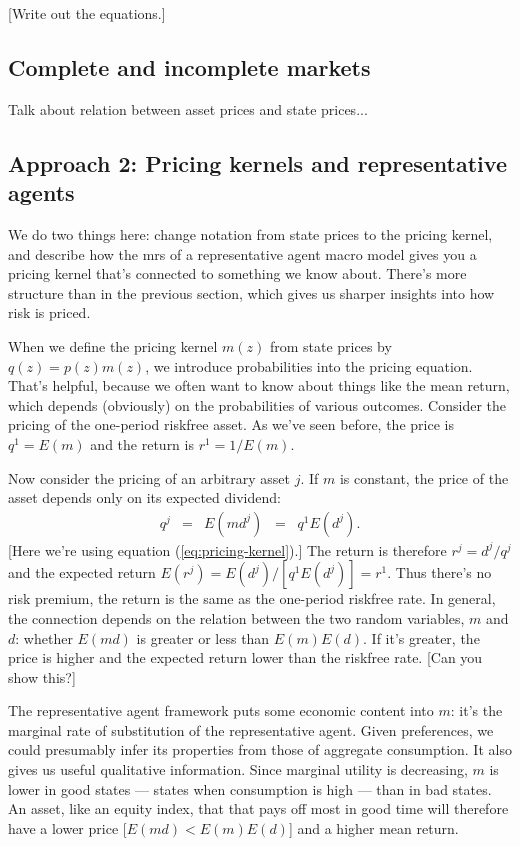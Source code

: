 \documentclass[11pt]{article}
\begin{document}
[Write out the equations.]


\subsection*{Complete and incomplete markets}

Talk about relation between asset prices and state prices...  



\subsection*{Approach 2:  Pricing kernels and representative agents}

We do two things here:  change notation from state prices to the pricing kernel,
and describe how the mrs of a representative agent macro model gives you a
pricing kernel that's connected to something we know about.
There's more structure than in the previous section,
which gives us sharper insights into how risk is priced.

When we define the pricing kernel $m(z)$ from state prices by $q(z) = p(z) m(z)$,
we introduce probabilities into the pricing equation.
That's helpful, because we often want to know about things like the mean
return, which depends (obviously) on the probabilities of various outcomes.
Consider the pricing of the one-period riskfree asset.
As we've seen before, the price is $q^1 = E(m)$ and the return is $r^1 = 1/E(m)$.

Now consider the pricing of an arbitrary asset $j$.
If $m$ is constant, the price of the asset depends only on its expected dividend:
\begin{eqnarray*}
    q^j &=& E (m d^j) \;\;=\;\; q^1 E(d^j) .
\end{eqnarray*}
[Here we're using equation (\ref{eq:pricing-kernel}).]
The return is therefore
$r^j = d^j/q^j$ and the expected return $E(r^j) = E(d^j)/[q^1 E(d^j)] = r^1$.
Thus there's no risk premium, the return is the same as the one-period
riskfree rate.
In general, the connection depends on the relation between
the two random variables, $m$ and $d$:
whether $E(md)$ is greater or less than $E(m) E(d)$.
If it's greater, the price is higher and the expected return lower
than the riskfree rate.
[Can you show this?]

The representative agent framework puts some economic content into
$m$:  it's the marginal rate of substitution of the representative agent.
Given preferences, we could presumably infer its properties
from those of aggregate consumption.
It also gives us useful qualitative information.
Since marginal utility is decreasing, $m$ is lower in
good states --- states when consumption is high ---
than in bad states.
An asset, like an equity index, that that pays off most in good time will
therefore have a lower price [$E(md) < E(m) E(d)$]
and a higher mean return.
\end{document}
